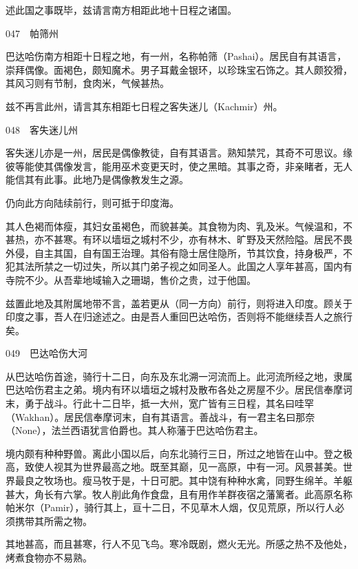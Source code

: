 \documentclass[12pt,UTF8]{ctexbook}
\begin{document}
述此国之事既毕，兹请言南方相距此地十日程之诸国。





047　帕筛州

巴达哈伤南方相距十日程之地，有一州，名称帕筛（Pashai）。居民自有其语言，崇拜偶像。面褐色，颇知魔术。男子耳戴金银环，以珍珠宝石饰之。其人颇狡猾，其风习则有节制，食肉米，气候甚热。

兹不再言此州，请言其东相距七日程之客失迷儿（Kachmir）州。





048　客失迷儿州

客失迷儿亦是一州，居民是偶像教徒，自有其语言。熟知禁咒，其奇不可思议。缘彼等能使其偶像发言，能用巫术变更天时，使之黑暗。其事之奇，非亲睹者，无人能信其有此事。此地乃是偶像教发生之源。

仍向此方向陆续前行，则可抵于印度海。

其人色褐而体瘦，其妇女虽褐色，而貌甚美。其食物为肉、乳及米。气候温和，不甚热，亦不甚寒。有环以墙垣之城村不少，亦有林木、旷野及天然险隘。居民不畏外侵，自主其国，自有国王治理。其俗有隐士居住隐所，节其饮食，持身极严，不犯其法所禁之一切过失，所以其门弟子视之如同圣人。此国之人享年甚高，国内有寺院不少。从吾辈地域输入之珊瑚，售价之贵，过于他国。

兹置此地及其附属地带不言，盖若更从（同一方向）前行，则将进入印度。顾关于印度之事，吾人在归途述之。由是吾人重回巴达哈伤，否则将不能继续吾人之旅行矣。





049　巴达哈伤大河

从巴达哈伤首途，骑行十二日，向东及东北溯一河流而上。此河流所经之地，隶属巴达哈伤君主之弟。境内有环以墙垣之城村及散布各处之房屋不少。居民信奉摩诃末，勇于战斗。行此十二日毕，抵一大州，宽广皆有三日程，其名曰哇罕（Wakhan）。居民信奉摩诃末，自有其语言。善战斗，有一君主名曰那奈（None），法兰西语犹言伯爵也。其人称藩于巴达哈伤君主。

境内颇有种种野兽。离此小国以后，向东北骑行三日，所过之地皆在山中。登之极高，致使人视其为世界最高之地。既至其巅，见一高原，中有一河。风景甚美。世界最良之牧场也。瘦马牧于是，十日可肥。其中饶有种种水禽，同野生绵羊。羊躯甚大，角长有六掌。牧人削此角作食盘，且有用作羊群夜宿之藩篱者。此高原名称帕米尔（Pamir），骑行其上，亘十二日，不见草木人烟，仅见荒原，所以行人必须携带其所需之物。

其地甚高，而且甚寒，行人不见飞鸟。寒冷既剧，燃火无光。所感之热不及他处，烤煮食物亦不易熟。
\end{document}
